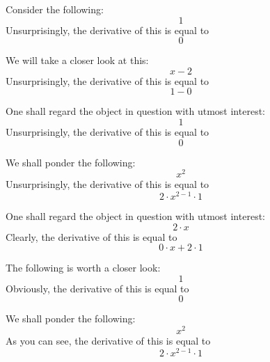 \documentclass{article}
\begin{document}
Consider the following:
\begin{equation}
1 
\end{equation}
Unsurprisingly, the derivative of this is equal to
\begin{equation}
0 
\end{equation}

We will take a closer look at this:
\begin{equation}
x - 2 
\end{equation}
Unsurprisingly, the derivative of this is equal to
\begin{equation}
1 - 0 
\end{equation}

One shall regard the object in question with utmost interest:
\begin{equation}
1 
\end{equation}
Unsurprisingly, the derivative of this is equal to
\begin{equation}
0 
\end{equation}

We shall ponder the following:
\begin{equation}
x ^{2 } 
\end{equation}
Unsurprisingly, the derivative of this is equal to
\begin{equation}
2 \cdot x ^{2 - 1 } \cdot 1 
\end{equation}

One shall regard the object in question with utmost interest:
\begin{equation}
2 \cdot x 
\end{equation}
Clearly, the derivative of this is equal to
\begin{equation}
0 \cdot x + 2 \cdot 1 
\end{equation}

The following is worth a closer look:
\begin{equation}
1 
\end{equation}
Obviously, the derivative of this is equal to
\begin{equation}
0 
\end{equation}

We shall ponder the following:
\begin{equation}
x ^{2 } 
\end{equation}
As you can see, the derivative of this is equal to
\begin{equation}
2 \cdot x ^{2 - 1 } \cdot 1 
\end{equation}
\end{document}
